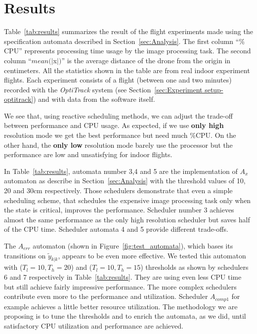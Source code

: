 \documentclass[ twoside, 12pt ]{article}
\begin{document}
\section{Results}
\label{sec:results}

Table~\ref{tab:results} summarizes the result of the flight experiments made using the specification automata described in Section~\ref{sec:Analysis}.
The first column ``\% CPU'' represents processing time usage by the image processing task.
The second column ``$mean(|$x$|)$'' is the average distance of the drone from the origin in centimeters.
All the statistics shown in the table are from real indoor experiment flights. Each experiment consists of a flight (between one and two minutes) recorded with the \textit{OptiTrack} system (see Section~\ref{sec:Experiment setup-optitrack}) and with data from the software itself.

We see that, using reactive scheduling methods, we can adjust the trade-off between performance and CPU usage. As expected, if we use \textbf{only high} resolution mode we get the best performance but need much \%CPU. On the other hand, the \textbf{only low} resolution mode barely use the processor but the performance are low and unsatisfying for indoor flights.

In Table~\ref{tab:results}, automata number 3,4 and 5 are the implementation of $A_{x}$ automaton as describe in Section~\ref{sec:Analysis} with the threshold values of 10, 20 and 30cm respectively.
Those schedulers demonstrate that even a simple scheduling scheme, that schedules the expensive image processing task only when the state is critical, improves the performance. Scheduler number 3 achieves almost the same performance as the only high resolution scheduler but saves half of the CPU time. Scheduler automata 4 and 5 provide different trade-offs.

The $A_{err}$ automaton (shown in Figure~\ref{fig:test_automata}), which bases its transitions on $\tilde{y}_{k|k}$, appears to be even more effective.
We tested this automaton with ($T_l=10 , T_h=20$) and ($T_l=10 , T_h=15$) thresholds as shown by schedulers 6 and 7 respectively in Table~\ref{tab:results}.
They are using even less CPU time but still achieve fairly impressive performance.
The more complex schedulers contribute even more to the performance and utilization. Scheduler $A_{comp1}$ for example achieves a little better resource utilization.
The methodology we are proposing is to tune the thresholds and to enrich the automata, as we did, until satisfactory CPU utilization and performance are achieved.
\end{document}
